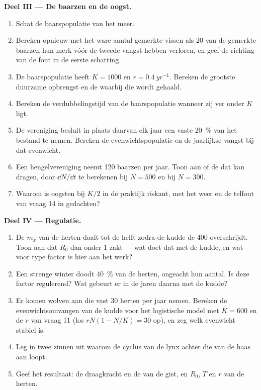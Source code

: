 \begin{problem}
\medskip
\noindent\textbf{Deel III --- De baarzen en de oogst.}
\begin{enumerate}[resume]
  \item Schat de baarspopulatie van het meer.
  \item Bereken opnieuw met het ware aantal gemerkte vissen als 20 van
        de gemerkte baarzen hun merk vóór de tweede vangst hebben
        verloren, en geef de richting van de fout in de eerste schatting.
  \item De baarspopulatie heeft $K = 1000$ en $r = \qty{0.4}{yr^{-1}}$.
        Bereken de grootste duurzame opbrengst en de  waarbij
        die wordt gehaald.
  \item Bereken de verdubbelingstijd van de baarspopulatie wanneer zij
        ver onder $K$ ligt.
  \item De vereniging besluit in plaats daarvan elk jaar een vaste
        \qty{20}{\%} van het bestand te nemen. Bereken de
        evenwichtspopulatie en de jaarlijkse vangst bij dat evenwicht.
  \item Een hengelvereniging neemt 120 baarzen per jaar. Toon aan of de
         dat kan dragen, door $\dd N/\dd t$ te berekenen bij $N =
        500$ en bij $N = 300$.
  \item Waarom is oogsten bij $K/2$ in de praktijk riskant, met het weer
        en de telfout van vraag 14 in gedachten?
\end{enumerate}

\medskip
\noindent\textbf{Deel IV --- Regulatie.}
\begin{enumerate}[resume]
  \item De $m_x$ van de herten daalt tot de helft zodra de kudde de 400
        overschrijdt. Toon aan dat $R_0$ dan onder 1 zakt --- wat doet dat
        met de kudde, en wat voor type factor is hier aan het werk?
  \item Een strenge winter doodt \qty{40}{\%} van de herten, ongeacht hun
        aantal. Is deze factor regulerend? Wat gebeurt er in de jaren
        daarna met de kudde?
  \item Er komen wolven aan die vast 30 herten per jaar nemen. Bereken de
        evenwichtsomvangen van de kudde voor het logistische model met
        $K = 600$ en de $r$ van vraag 11 (los $rN(1 - N/K) = 30$ op), en
        zeg welk evenwicht stabiel is.
  \item Leg in twee zinnen uit waarom de cyclus van de lynx achter die
        van de haas aan loopt.
  \item Geef het resultaat: de draagkracht en de 
        van de gist, en $R_0$, $T$ en $r$ van de herten.
\end{enumerate}
\end{problem}
